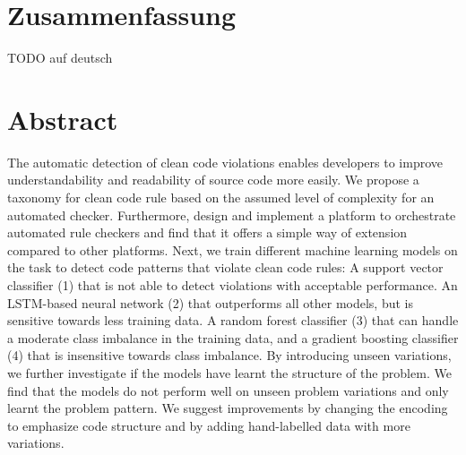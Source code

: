 \section*{Zusammenfassung}

TODO auf deutsch
\section*{Abstract}    
The automatic detection of clean code violations enables developers to improve understandability and readability of source code more easily. We propose a taxonomy for clean code rule based on the assumed level of complexity for an automated checker. Furthermore, design and implement a platform to orchestrate automated rule checkers and find that it offers a simple way of extension compared to other platforms. Next, we train different machine learning models on the task to detect code patterns that violate clean code rules: A support vector classifier (1) that is not able to detect violations with acceptable performance. An LSTM-based neural network (2) that outperforms all other models, but is sensitive towards less training data. A random forest classifier (3) that can handle a moderate class imbalance in the training data, and a gradient boosting classifier (4) that is insensitive towards class imbalance. By introducing unseen variations, we further investigate if the models have learnt the structure of the problem. We find that the models do not perform well on unseen problem variations and only learnt the problem pattern. We suggest improvements by changing the encoding to emphasize code structure and by adding hand-labelled data with more variations.
